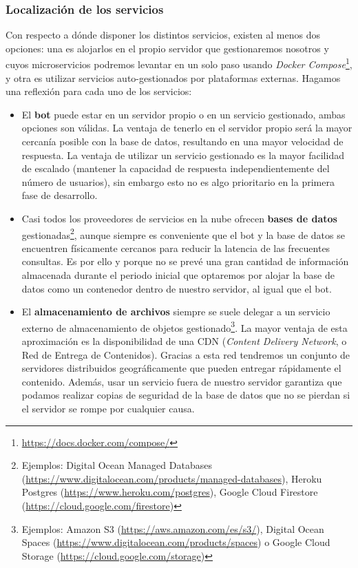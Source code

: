 \subsubsection{Localización de los servicios}

Con respecto a dónde disponer los distintos servicios, existen al menos dos opciones: una es alojarlos en el propio servidor que gestionaremos nosotros y cuyos microservicios podremos levantar en un solo paso usando \textit{Docker Compose}\footnote{\url{https://docs.docker.com/compose/}}, y otra es utilizar servicios auto-gestionados por plataformas externas. Hagamos una reflexión para cada uno de los servicios:

\begin{itemize}
    \item El \textbf{bot} puede estar en un servidor propio o en un servicio gestionado, ambas opciones son válidas. La ventaja de tenerlo en el servidor propio será la mayor cercanía posible con la base de datos, resultando en una mayor velocidad de respuesta. La ventaja de utilizar un servicio gestionado es la mayor facilidad de escalado (mantener la capacidad de respuesta independientemente del número de usuarios), sin embargo esto no es algo prioritario en la primera fase de desarrollo.
    \item Casi todos los proveedores de servicios en la nube ofrecen \textbf{bases de datos} gestionadas\footnote{Ejemplos: Digital Ocean Managed Databases (\url{https://www.digitalocean.com/products/managed-databases}), Heroku Postgres (\url{https://www.heroku.com/postgres}), Google Cloud Firestore (\url{https://cloud.google.com/firestore})}, aunque siempre es conveniente que el bot y la base de datos se encuentren físicamente cercanos para reducir la latencia de las frecuentes consultas. Es por ello y porque no se prevé una gran cantidad de información almacenada durante el periodo inicial que optaremos por alojar la base de datos como un contenedor dentro de nuestro servidor, al igual que el bot.
    \item El \textbf{almacenamiento de archivos} siempre se suele delegar a un servicio externo de almacenamiento de objetos gestionado\footnote{Ejemplos: Amazon S3 (\url{https://aws.amazon.com/es/s3/}), Digital Ocean Spaces (\url{https://www.digitalocean.com/products/spaces}) o Google Cloud Storage (\url{https://cloud.google.com/storage})}. La mayor ventaja de esta aproximación es la disponibilidad de una CDN (\textit{Content Delivery Network}, o Red de Entrega de Contenidos)\cite{whatIsCDN}. Gracias a esta red tendremos un conjunto de servidores distribuidos geográficamente que pueden entregar rápidamente el contenido. Además, usar un servicio fuera de nuestro servidor garantiza que podamos realizar copias de seguridad de la base de datos que no se pierdan si el servidor se rompe por cualquier causa. 
\end{itemize}


